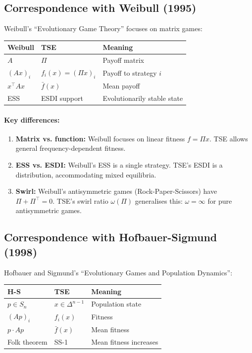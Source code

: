 \documentclass[12pt]{article}
\begin{document}
\subsection{Correspondence with Weibull (1995)}

Weibull's ``Evolutionary Game Theory'' focuses on matrix games:

\begin{center}
\begin{tabular}{lll}
\toprule
\textbf{Weibull} & \textbf{TSE} & \textbf{Meaning} \\
\midrule
$A$ & $\Pi$ & Payoff matrix \\
$(Ax)_i$ & $f_i(x) = (\Pi x)_i$ & Payoff to strategy $i$ \\
$x^\top A x$ & $\bar{f}(x)$ & Mean payoff \\
ESS & ESDI support & Evolutionarily stable state \\
\bottomrule
\end{tabular}
\end{center}

\paragraph{Key differences:}

\begin{enumerate}
\item \textbf{Matrix vs. function:} Weibull focuses on linear fitness $f = \Pi x$. TSE allows general frequency-dependent fitness.

\item \textbf{ESS vs. ESDI:} Weibull's ESS is a single strategy. TSE's ESDI is a distribution, accommodating mixed equilibria.

\item \textbf{Swirl:} Weibull's antisymmetric games (Rock-Paper-Scissors) have $\Pi + \Pi^\top = 0$. TSE's swirl ratio $\omega(\Pi)$ generalises this: $\omega = \infty$ for pure antisymmetric games.
\end{enumerate}

\subsection{Correspondence with Hofbauer-Sigmund (1998)}

Hofbauer and Sigmund's ``Evolutionary Games and Population Dynamics'':

\begin{center}
\begin{tabular}{lll}
\toprule
\textbf{H-S} & \textbf{TSE} & \textbf{Meaning} \\
\midrule
$p \in S_n$ & $x \in \Delta^{n-1}$ & Population state \\
$(Ap)_i$ & $f_i(x)$ & Fitness \\
$p \cdot Ap$ & $\bar{f}(x)$ & Mean fitness \\
Folk theorem & SS-1 & Mean fitness increases \\
\bottomrule
\end{tabular}
\end{center}
\end{document}
